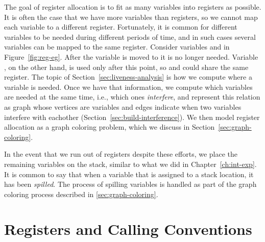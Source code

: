 \documentclass[11pt]{book}
\begin{document}
The goal of register allocation is to fit as many variables into
registers as possible. It is often the case that we have more
variables than registers, so we cannot map each variable to a
different register. Fortunately, it is common for different variables
to be needed during different periods of time, and in such cases
several variables can be mapped to the same register.  Consider
variables  and  in Figure~\ref{fig:reg-eg}.  After the
variable  is moved to  it is no longer needed.
Variable , on the other hand, is used only after this point,
so  and  could share the same register. The topic of
Section~\ref{sec:liveness-analysis} is how we compute where a variable
is needed.  Once we have that information, we compute which variables
are needed at the same time, i.e., which ones \emph{interfere}, and
represent this relation as graph whose vertices are variables and
edges indicate when two variables interfere with eachother
(Section~\ref{sec:build-interference}). We then model register
allocation as a graph coloring problem, which we discuss in
Section~\ref{sec:graph-coloring}.

In the event that we run out of registers despite these efforts, we
place the remaining variables on the stack, similar to what we did in
Chapter~\ref{ch:int-exp}. It is common to say that when a variable
that is assigned to a stack location, it has been \emph{spilled}. The
process of spilling variables is handled as part of the graph coloring
process described in \ref{sec:graph-coloring}.

\section{Registers and Calling Conventions}
\label{sec:calling-conventions}
\end{document}
